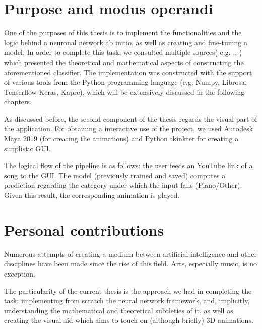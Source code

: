 	\section{Purpose and modus operandi}

	One of the purposes of this thesis is to implement the functionalities and the logic behind a neuronal network ab initio, as well as creating and fine-tuning a model. In order to complete this task, we consulted multiple sources( e.g. \cite{nnfs},\cite{DLFMIR},\cite{BACDNN} ) which presented the theoretical and mathematical aspects of constructing the aforementioned classifier. The implementation was constructed with the support of various tools from the Python programming language (e.g. Numpy, Librosa, Tenserflow Keras, Kapre), which will be extensively discussed in the following chapters.

	As discussed before, the second component of the thesis regards the visual part of the application. For obtaining a interactive use of the project, we used Autodesk Maya 2019 (for creating the animations) and Python tkinkter for creating a simplistic GUI.

	The logical flow of the pipeline is as follows: the user feeds an YouTube link of a song to the GUI. The model (previously trained and saved) computes a prediction regarding the category under which the input falls (Piano/Other). Given this result, the corresponding animation is played.

	\section{Personal contributions}


	Numerous attempts of creating a medium between artificial intelligence and other disciplines have been made since the rise of this field. Arts, especially music, is no exception.

	The particularity of the current thesis is the approach we had in completing the task: implementing from scratch the neural network framework, and, implicitly, understanding the mathematical and theoretical subtleties of it, as well as creating the visual aid which aims to touch on (although briefly) 3D animations.

